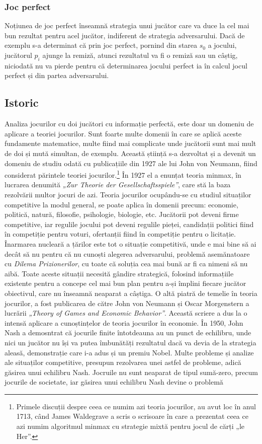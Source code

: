 \documentclass[12pt,twoside,a4paper,fleqn]{book}
\theoremstyle{definition}
\begin{document}
\subsubsection{Joc perfect}
Noțiunea de joc perfect înseamnă strategia unui jucător care va duce la cel mai bun rezultat pentru acel jucător, indiferent de strategia adversarului. Dacă de exemplu s-a determinat că prin joc perfect, pornind din starea $s_{0}$ a jocului, jucătorul $p_{i}$ ajunge la remiză, atunci rezultatul va fi o remiză sau un câștig, niciodată nu va pierde pentru că determinarea jocului perfect ia în calcul jocul perfect și din partea adversarului.

\subsection{Istoric}
Analiza jocurilor cu doi jucători cu informație perfectă, este doar un domeniu de aplicare a teoriei jocurilor. Sunt foarte multe domenii în care se aplică aceste fundamente matematice, multe fiind mai complicate unde jucătorii sunt mai mult de doi și mută simultan, de exemplu. Această știință s-a dezvoltat și a devenit un domeniu de studiu odată cu publicațiile din 1927 ale lui John von Neumann, fiind considerat părintele teoriei jocurilor.\footnote{Primele discuții despre ceea ce numim azi teoria jocurilor, au avut loc în anul 1713, când James Waldegrave a scris o scrisoare în care a prezentat ceea ce azi numim algoritmul minmax cu strategie mixtă pentru jocul de cărți „le Her”.} În 1927 el a enunțat teoria minmax, în lucrarea denumită \emph{„Zur Theorie der Gesellschaftsspiele”}, care stă la baza rezolvării multor jocuri de azi. Teoria jocurilor ocupându-se cu studiul situaților competitive la modul general, se poate aplica în domenii precum: economie, politică, natură, filosofie, psihologie, biologie, etc. Jucătorii pot deveni firme competitive, iar regulile jocului pot deveni regulile pieței, candidații politici fiind în competiție pentru voturi, ofertanții fiind în competiție pentru o licitație. Înarmarea nucleară a țărilor este tot o situație competitivă, unde e mai bine să ai decât să nu pentru că nu cunoști alegerea adversarului, problemă asemănatoare cu \emph{Dilema Prizionerilor}, cu toate că soluția cea mai bună ar fi ca nimeni să nu aibă. Toate aceste situații necesită gândire strategică, folosind informațiile existente pentru a concepe cel mai bun plan pentru a-și împlini fiecare jucător obiectivul, care nu înseamnă neaparat a câștiga. O altă piatră de temelie în teoria jocurilor, a fost publicarea de către John von Neumann și Oscar Morgenstern a lucrării \emph{„Theory of Games and Economic Behavior”}. Această scriere a dus la o intensă aplicare a cunoștințelor de teoria jocurilor în economie. În 1950, John Nash a demosntrat că jocurile finite întotdeauna au un punct de echilibru, unde nici un jucător nu își va putea îmbunătăți rezultatul dacă va devia de la strategia aleasă, demonstrație care i-a adus și un premiu Nobel. Multe probleme și analize ale situaților competitive, presupun rezolvarea unei astfel de probleme, adică găsirea unui echilibru Nash. Jocruile nu sunt neaparat de tipul sumă-zero, precum jocurile de societate, iar găsirea unui echilibru Nash devine o problemă 
\end{document}
